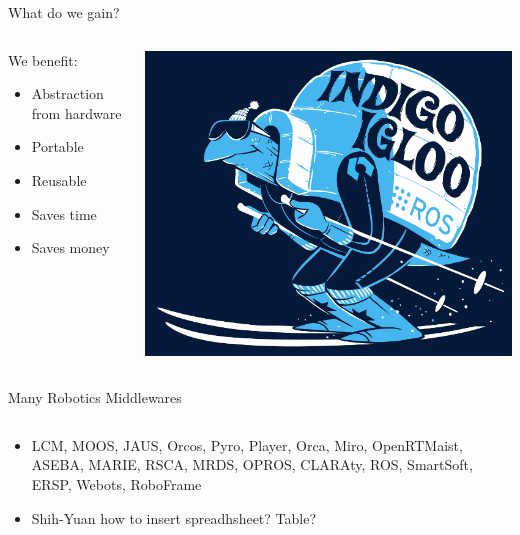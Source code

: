 \documentclass[aspectratio=43]{beamer}
\begin{document}
\begin{frame}{What do we gain?}
\begin{columns}
	\begin{column}{0.55\textwidth}
We benefit:		\begin{itemize}
			\item Abstraction from hardware
                        \item Portable
                        \item Reusable
                        \item Saves time
                        \item Saves money
		\end{itemize} \end{column} \begin{column}{0.45\textwidth} \centering \includegraphics[width=\textwidth]{fig/indigoigloo_600.png} \end{column}
\end{columns}

\end{frame}
 
\begin{frame}{Many Robotics Middlewares}
	\begin{columns}
		\begin{column}{0.6\textwidth}
			\begin{itemize}
				\item LCM, MOOS, JAUS, Orcos, Pyro, Player, Orca, Miro, OpenRTMaist, ASEBA, MARIE, RSCA, MRDS, OPROS, CLARAty, ROS, SmartSoft, ERSP, Webots, RoboFrame
                                \item \alert{Shih-Yuan} how to insert spreadhsheet? Table?
			\end{itemize}
		\end{column}
		\begin{column}{0.4\textwidth}
			\centering
		\end{column}
	\end{columns}
\end{frame}
\end{document}

